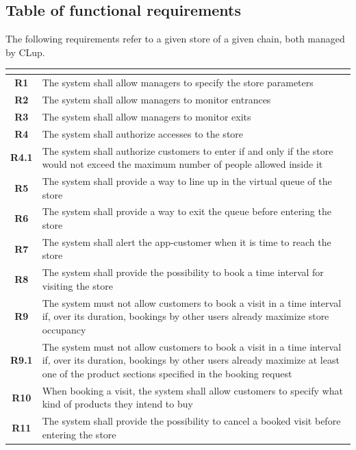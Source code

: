 \documentclass[a4paper,oneside,11pt]{book}   %
\begin{document}
    \subsection{Table of functional requirements}
    The following requirements refer to a given store of a given chain, both managed by CLup.
    \begin{longtable}[c]{|>{\bfseries{}}c|H{.65\textwidth}|}
        \hline
         \\
        \hline
        R1   & The system shall allow managers to specify the store parameters \\ \hline
        R2   & The system shall allow managers to monitor entrances \\ \hline
        R3   & The system shall allow managers to monitor exits \\ \hline
        R4   & The system shall authorize accesses to the store \\ \hline
        R4.1 & The system shall authorize customers to enter if and only if the store would not exceed the maximum number of people allowed inside it \\ \hline
        R5   & The system shall provide a way to line up in the virtual queue of the store \\ \hline
        R6   & The system shall provide a way to exit the queue before entering the store \\ \hline
        R7   & The system shall alert the app-customer when it is time to reach the store \\ \hline
        R8   & The system shall provide the possibility to book a time interval for visiting the store \\ \hline
        R9   & The system must not allow customers to book a visit in a time interval if, over its duration, bookings by other users already maximize store occupancy \\ \hline
        R9.1 & The system must not allow customers to book a visit in a time interval if, over its duration, bookings by other users already maximize at least one of the product sections specified in the booking request \\ \hline
        R10  & When booking a visit, the system shall allow customers to specify what kind of products they intend to buy \\ \hline
        R11  & The system shall provide the possibility to cancel a booked visit before entering the store \\ \hline

\end{longtable}
\end{document}
